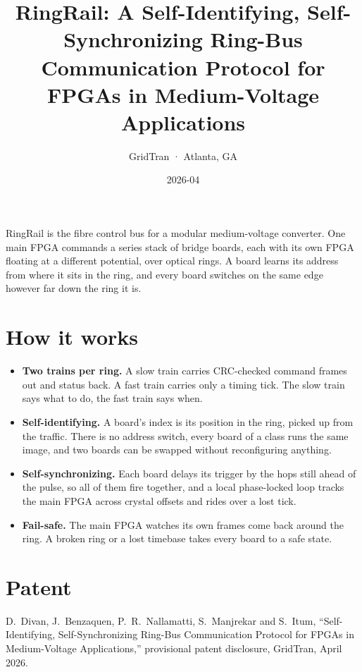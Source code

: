 \title{RingRail: A Self-Identifying, Self-Synchronizing Ring-Bus Communication Protocol for FPGAs in Medium-Voltage Applications}
\subtitle{GridTran · Atlanta, GA}
\date{2026-04}




RingRail is the fibre control bus for a modular medium-voltage converter. One
main FPGA commands a series stack of bridge boards, each with its own FPGA
floating at a different potential, over optical rings. A board learns its
address from where it sits in the ring, and every board switches on the same
edge however far down the ring it is.

\section{How it works}

\begin{itemize}
  \item \textbf{Two trains per ring.} A slow train carries CRC-checked command
        frames out and status back. A fast train carries only a timing tick.
        The slow train says what to do, the fast train says when.
  \item \textbf{Self-identifying.} A board's index is its position in the ring,
        picked up from the traffic. There is no address switch, every board of
        a class runs the same image, and two boards can be swapped without
        reconfiguring anything.
  \item \textbf{Self-synchronizing.} Each board delays its trigger by the hops
        still ahead of the pulse, so all of them fire together, and a local
        phase-locked loop tracks the main FPGA across crystal offsets and
        rides over a lost tick.
  \item \textbf{Fail-safe.} The main FPGA watches its own frames come back
        around the ring. A broken ring or a lost timebase takes every board to
        a safe state.
\end{itemize}

\section{Patent}

D.~Divan, J.~Benzaquen, P.~R.~Nallamatti, S.~Manjrekar and S.~Itum,
``Self-Identifying, Self-Synchronizing Ring-Bus Communication Protocol for
FPGAs in Medium-Voltage Applications,'' provisional patent disclosure,
GridTran, April 2026.


